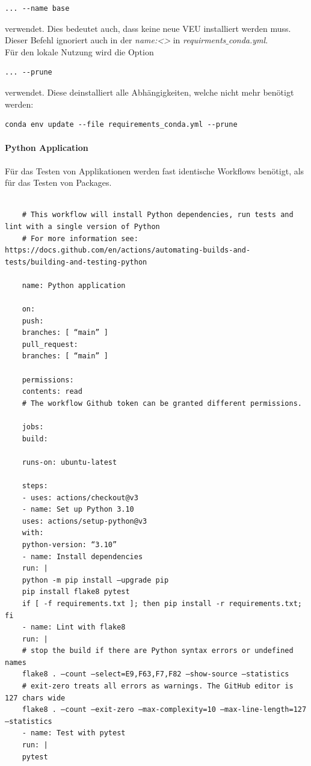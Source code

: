\begin{lstlisting}[style=CMD, caption={conda update option}, captionpos=b]
	... --name base
\end{lstlisting}
verwendet. Dies bedeutet auch, dass keine neue \gls{VEU} installiert werden muss. Dieser Befehl ignoriert auch in der \textit{name:<>} in \textit{requirments}$\_$\textit{conda.yml}.\\

Für den lokale Nutzung wird die Option

\begin{lstlisting}[style=CMD, caption={conda prune option}, captionpos=b]
	... --prune
\end{lstlisting}
verwendet. Diese deinstalliert alle Abhängigkeiten, welche nicht mehr benötigt werden:

\begin{lstlisting}[style=CMD, caption={Gesamthafter Befehl für lokalen Gebrauch}, captionpos=b]
	conda env update --file requirements_conda.yml --prune
\end{lstlisting}

\paragraph{Python Application}
Für das Testen von Applikationen werden fast identische Workflows benötigt, als für das Testen von Packages.
\begin{lstlisting}[style=Config, caption={GitHub Action Temple: Python Package create and test with conda}, captionpos=b]
	
	# This workflow will install Python dependencies, run tests and lint with a single version of Python
	# For more information see: https://docs.github.com/en/actions/automating-builds-and-tests/building-and-testing-python
	
	name: Python application
	
	on:
	push:
	branches: [ “main” ]
	pull_request:
	branches: [ “main” ]
	
	permissions:
	contents: read
	# The workflow Github token can be granted different permissions.
	
	jobs:
	build:
	
	runs-on: ubuntu-latest
	
	steps:
	- uses: actions/checkout@v3
	- name: Set up Python 3.10
	uses: actions/setup-python@v3
	with:
	python-version: “3.10”
	- name: Install dependencies
	run: |
	python -m pip install —upgrade pip
	pip install flake8 pytest
	if [ -f requirements.txt ]; then pip install -r requirements.txt; fi
	- name: Lint with flake8
	run: |
	# stop the build if there are Python syntax errors or undefined names
	flake8 . —count —select=E9,F63,F7,F82 —show-source —statistics
	# exit-zero treats all errors as warnings. The GitHub editor is 127 chars wide
	flake8 . —count —exit-zero —max-complexity=10 —max-line-length=127 —statistics
	- name: Test with pytest
	run: |
	pytest
\end{lstlisting}

